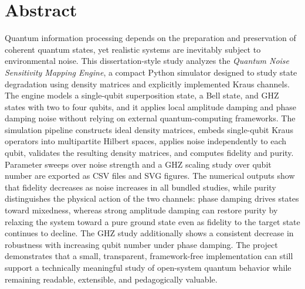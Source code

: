 \chapter*{Abstract}

Quantum information processing depends on the preparation and preservation of coherent quantum states, yet realistic systems are inevitably subject to environmental noise. This dissertation-style study analyzes the \emph{Quantum Noise Sensitivity Mapping Engine}, a compact Python simulator designed to study state degradation using density matrices and explicitly implemented Kraus channels. The engine models a single-qubit superposition state, a Bell state, and GHZ states with two to four qubits, and it applies local amplitude damping and phase damping noise without relying on external quantum-computing frameworks. The simulation pipeline constructs ideal density matrices, embeds single-qubit Kraus operators into multipartite Hilbert spaces, applies noise independently to each qubit, validates the resulting density matrices, and computes fidelity and purity. Parameter sweeps over noise strength and a GHZ scaling study over qubit number are exported as CSV files and SVG figures. The numerical outputs show that fidelity decreases as noise increases in all bundled studies, while purity distinguishes the physical action of the two channels: phase damping drives states toward mixedness, whereas strong amplitude damping can restore purity by relaxing the system toward a pure ground state even as fidelity to the target state continues to decline. The GHZ study additionally shows a consistent decrease in robustness with increasing qubit number under phase damping. The project demonstrates that a small, transparent, framework-free implementation can still support a technically meaningful study of open-system quantum behavior while remaining readable, extensible, and pedagogically valuable.
